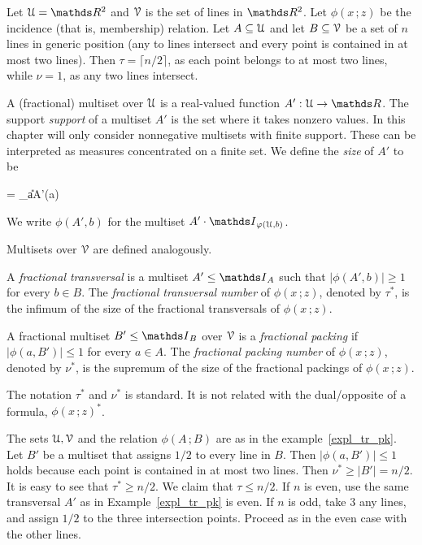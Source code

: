 \documentclass[scombinatorics.tex]{subfiles}
\begin{document}
\begin{example}\label{expl_tr_pk}
  Let $\U=\RR^2$ and $\EuScript V$ is the set of lines in $\RR^2$.
  Let $\phi(x\,;z)$ be the incidence (that is, membership) relation.
  Let $A\subseteq\EuScript U$ and let $B\subseteq\EuScript V$ be a set of $n$ lines in generic position
  (any to lines intersect and every point is contained in at most two lines).
  Then $\tau=\lceil n/2\rceil$, as each point belongs to at most two lines, while $\nu=1$, as any two lines intersect.\QED
\end{example}  


A (fractional) multiset over $\EuScript U$ is a real-valued function $A':\U\to\RR$.
The support \emph{support} of a multiset $A'$ is the set where it takes nonzero values.
In this chapter will only consider nonnegative multisets with finite support.
These can be interpreted as measures concentrated on a finite set.
We define the \emph{size\/} of $A'$ to be\smallskip 

{=}
{\sum_{a\in\U}A'(a)}

We write \emph{$\phi(A',b)$\/} for the multiset $A'\cdot\Indicator_{\phi(\U,b)}$.

Multisets over $\EuScript V$ are defined analogously.
 
A \emph{fractional transversal\/} is a multiset $A'\le\Indicator_A$ such that $|\phi(A', b)|\ge1$ for every $b\in B$.
The \emph{fractional transversal number\/} of $\phi(x\,;z)$, denoted by $\tau^*$, is the  infimum of the size of the fractional transversals of $\phi(x\,;z)$.

A fractional multiset $B'\le\Indicator_B$ over $\EuScript V$ is a \emph{fractional packing\/} if $|\phi(a,B')|\le1$ for every $a\in A$.
The \emph{fractional packing number\/} of $\phi(x\,;z)$, denoted by $\nu^*$, is the supremum of the size of the fractional packings of $\phi(x\,;z)$.

The notation $\tau^*$ and $\nu^*$ is standard. 
It is not related with the dual/opposite of a formula, $\phi(x\,;z)^*$. 

\begin{example}
  The sets $\EuScript U,\EuScript V$ and the relation $\phi(A\,;B)$ are as in the example~\ref{expl_tr_pk}.
  Let $B'$ be a multiset that assigns $1/2$ to every line in $B$. Then $|\phi(a,B')|\le1$ holds because each point is contained in at most two lines.
  Then $\nu^*\ge |B'|=n/2$.
  It is easy to see that $\tau^*\ge n/2$.
  We claim that $\tau\le n/2$.
  If $n$ is even, use the same transversal $A'$ as in Example~\ref{expl_tr_pk} is even.
  If $n$ is odd, take $3$ any lines, and assign $1/2$ to the three intersection points.
  Proceed as in the even case with the other lines.\QED
\end{example}
\end{document}
